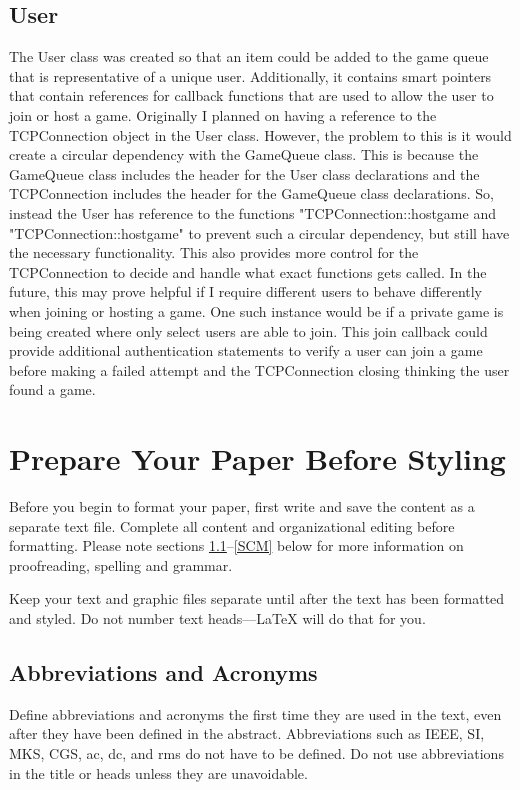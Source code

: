\documentclass[conference]{IEEEtran}
\begin{document}
\subsection{User}
The User class was created so that an item could be added to the game queue that is representative of a unique user.
Additionally, it contains smart pointers that contain references for callback functions that are used to allow the user to join or host a game.
Originally I planned on having a reference to the TCPConnection object in the User class.
However, the problem to this is it would create a circular dependency with the GameQueue class.
This is because the GameQueue class includes the header for the User class declarations and the TCPConnection includes the header for the GameQueue class declarations.
So, instead the User has reference to the functions "TCPConnection::host\textunderscore game and "TCPConnection::host\textunderscore game" to prevent such a circular dependency, but still have the necessary functionality.
This also provides more control for the TCPConnection to decide and handle what exact functions gets called.
In the future, this may prove helpful if I require different users to behave differently when joining or hosting a game.
One such instance would be if a private game is being created where only select users are able to join.
This join callback could provide additional authentication statements to verify a user can join a game before making a failed attempt and the TCPConnection closing thinking the user found a game.




\section{Prepare Your Paper Before Styling}
Before you begin to format your paper, first write and save the content as a 
separate text file. Complete all content and organizational editing before 
formatting. Please note sections \ref{AA}--\ref{SCM} below for more information on 
proofreading, spelling and grammar.

Keep your text and graphic files separate until after the text has been 
formatted and styled. Do not number text heads---{\LaTeX} will do that 
for you.

\subsection{Abbreviations and Acronyms}\label{AA}
Define abbreviations and acronyms the first time they are used in the text, 
even after they have been defined in the abstract. Abbreviations such as 
IEEE, SI, MKS, CGS, ac, dc, and rms do not have to be defined. Do not use 
abbreviations in the title or heads unless they are unavoidable.
\end{document}
